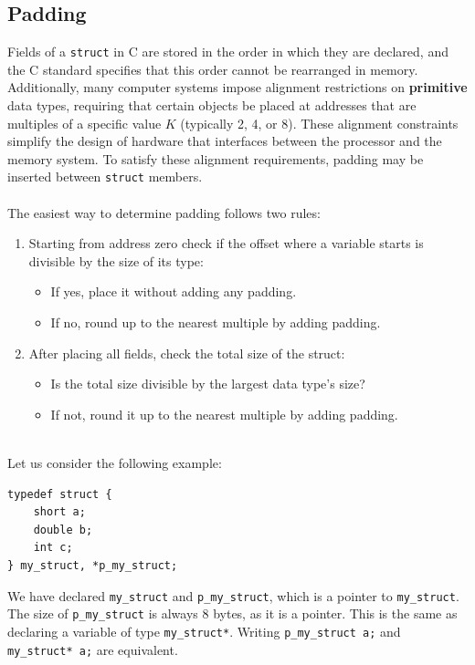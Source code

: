 \documentclass{article}
\begin{document}
\subsection{Padding}
Fields of a \texttt{struct} in C are stored in the order in which they are declared, and the C standard specifies that this order cannot be rearranged in memory. Additionally, many computer systems impose alignment restrictions on \textbf{primitive} data types, requiring that certain objects be placed at addresses that are multiples of a specific value \( K \) (typically 2, 4, or 8). These alignment constraints simplify the design of hardware that interfaces between the processor and the memory system. To satisfy these alignment requirements, padding may be inserted between \texttt{struct} members. \\
\\
\clearpage
The easiest way to determine padding follows two rules:

\begin{enumerate}
    \item Starting from address zero check if the offset where a variable starts is divisible by the size of its type:
    \begin{itemize}
        \item If yes, place it without adding any padding.
        \item If no, round up to the nearest multiple by adding padding.
    \end{itemize}
    
    \item After placing all fields, check the total size of the struct:
    \begin{itemize}
        \item Is the total size divisible by the largest data type's size?
        \item If not, round it up to the nearest multiple by adding padding.
    \end{itemize}
\end{enumerate}
\\
Let us consider the following example:

\noindent\begin{minipage}{0.45\textwidth}
\begin{lstlisting}
typedef struct {
    short a; 
    double b;
    int c;
} my_struct, *p_my_struct;
\end{lstlisting}
\end{minipage}

We have declared \texttt{my\_struct} and \texttt{p\_my\_struct}, which is a pointer to \texttt{my\_struct}. The size of \texttt{p\_my\_struct} is always 8 bytes, as it is a pointer. This is the same as declaring a variable of type \texttt{my\_struct*}. Writing \texttt{p\_my\_struct a;} and \texttt{my\_struct* a;} are equivalent.
\end{document}
